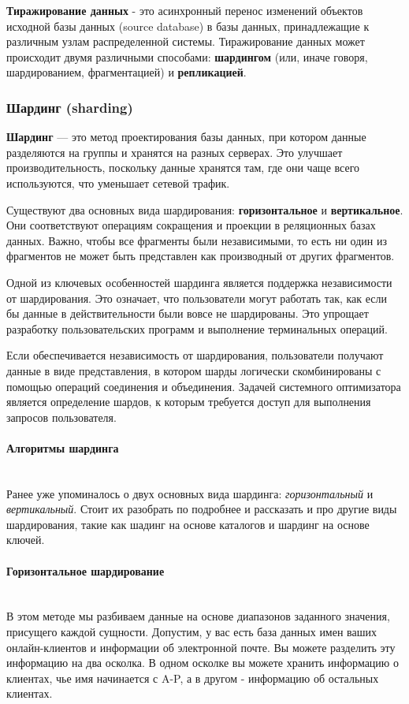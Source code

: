 \textbf{Тиражирование данных} - это асинхронный перенос изменений объектов исходной базы данных (source database)
в базы данных, принадлежащие к различным узлам распределенной системы. Тиражирование данных может происходит
двумя различными способами: \textbf{шардингом} (или, иначе говоря, шардированием, фрагментацией) и \textbf{репликацией}.

\subsubsection{Шардинг (sharding)}

\textbf{Шардинг} — это метод проектирования базы данных, при котором данные разделяются на группы и хранятся на разных серверах. Это улучшает производительность, поскольку данные хранятся там, где они чаще всего используются, что уменьшает сетевой трафик.

Существуют два основных вида шардирования: \textbf{горизонтальное} и \textbf{вертикальное}. Они соответствуют операциям сокращения и проекции в реляционных базах данных. Важно, чтобы все фрагменты были независимыми, то есть ни один из фрагментов не может быть представлен как производный от других фрагментов.

Одной из ключевых особенностей шардинга является поддержка независимости от шардирования. Это означает, что пользователи могут работать так, как если бы данные в действительности были вовсе не шардированы. Это упрощает разработку пользовательских программ и выполнение терминальных операций.

Если обеспечивается независимость от шардирования, пользователи получают данные в виде представления, в котором шарды логически скомбинированы с помощью операций соединения и объединения. Задачей системного оптимизатора является определение шардов, к которым требуется доступ для выполнения запросов пользователя.
\autocite{IntroBD2014}

\paragraph{Алгоритмы шардинга} ~\\
Ранее уже упоминалось о двух основных вида шардинга: \textit{горизонтальный} и \textit{вертикальный}. Стоит их разобрать по подробнее и
рассказать и про другие виды шардирования, такие как шадинг на основе каталогов и шардинг на основе ключей.

\paragraph{Горизонтальное шардирование} ~\\
В этом методе мы разбиваем данные на основе диапазонов заданного значения, присущего каждой сущности. Допустим, у вас
есть база данных имен ваших онлайн-клиентов и информации об электронной почте. Вы можете разделить эту информацию на
два осколка. В одном осколке вы можете хранить информацию о клиентах, чье имя начинается с A-P, а в другом - информацию
об остальных клиентах.

